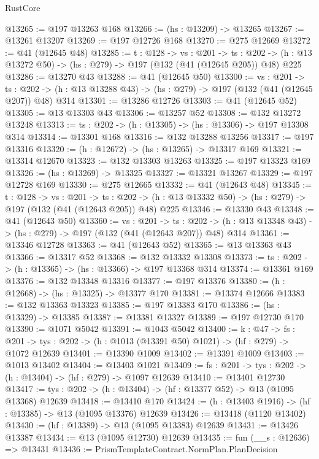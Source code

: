 \begin{lexlean}{RustCore}
\begin{coremodule}
@13265 := @197 @13263 @168
@13266 := (hs : @13209) -> @13265
@13267 := @13261 @13207
@13269 := @197 @12726 @168
@13270 := @275 @12669
@13272 := @41 (@12645 @48)
@13285 := {t : @128} ->
  {vs : @201} ->
  {ts : @202} -> (h : @13 @13272 @50) -> (hs : @279) -> @197 (@132 (@41 (@12645 @205)) @48) @225
@13286 := @13270 @43
@13288 := @41 (@12645 @50)
@13300 := {vs : @201} ->
  {ts : @202} -> (h : @13 @13288 @43) -> (hs : @279) -> @197 (@132 (@41 (@12645 @207)) @48) @314
@13301 := @13286 @12726
@13303 := @41 (@12645 @52)
@13305 := @13 @13303 @43
@13306 := @13257 @52
@13308 := @132 @13272 @13248
@13313 := {ts : @202} -> (h : @13305) -> (hs : @13306) -> @197 @13308 @314
@13314 := @13301 @168
@13316 := @132 @13288 @13256
@13317 := @197 @13316
@13320 := (h : @12672) -> (hs : @13265) -> @13317 @169
@13321 := @13314 @12670
@13323 := @132 @13303 @13263
@13325 := @197 @13323 @169
@13326 := (hs : @13269) -> @13325
@13327 := @13321 @13267
@13329 := @197 @12728 @169
@13330 := @275 @12665
@13332 := @41 (@12643 @48)
@13345 := {t : @128} ->
  {vs : @201} ->
  {ts : @202} -> (h : @13 @13332 @50) -> (hs : @279) -> @197 (@132 (@41 (@12643 @205)) @48) @225
@13346 := @13330 @43
@13348 := @41 (@12643 @50)
@13360 := {vs : @201} ->
  {ts : @202} -> (h : @13 @13348 @43) -> (hs : @279) -> @197 (@132 (@41 (@12643 @207)) @48) @314
@13361 := @13346 @12728
@13363 := @41 (@12643 @52)
@13365 := @13 @13363 @43
@13366 := @13317 @52
@13368 := @132 @13332 @13308
@13373 := {ts : @202} -> (h : @13365) -> (hs : @13366) -> @197 @13368 @314
@13374 := @13361 @169
@13376 := @132 @13348 @13316
@13377 := @197 @13376
@13380 := (h : @12668) -> (hs : @13325) -> @13377 @170
@13381 := @13374 @12666
@13383 := @132 @13363 @13323
@13385 := @197 @13383 @170
@13386 := (hs : @13329) -> @13385
@13387 := @13381 @13327
@13389 := @197 @12730 @170
@13390 := @1071 @5042
@13391 := @1043 @5042
@13400 := {k : @47} ->
  {fs : @201} -> {tys : @202} -> (h : @1013 (@13391 @50) @1021) -> (hf : @279) -> @1072 @12639
@13401 := @13390 @1009
@13402 := @13391 @1009
@13403 := @1013 @13402
@13404 := @13403 @1021
@13409 := {fs : @201} -> {tys : @202} -> (h : @13404) -> (hf : @279) -> @1097 @12639
@13410 := @13401 @12730
@13417 := {tys : @202} -> (h : @13404) -> (hf : @13377 @52) -> @13 (@1095 @13368) @12639
@13418 := @13410 @170
@13424 := (h : @13403 @1916) -> (hf : @13385) -> @13 (@1095 @13376) @12639
@13426 := @13418 (@1120 @13402)
@13430 := (hf : @13389) -> @13 (@1095 @13383) @12639
@13431 := @13426 @13387
@13434 := @13 (@1095 @12730) @12639
@13435 := fun (__s : @12636) => @13431
@13436 := PrismTemplateContract.NormPlan.PlanDecision

\end{coremodule}
\end{lexlean}
